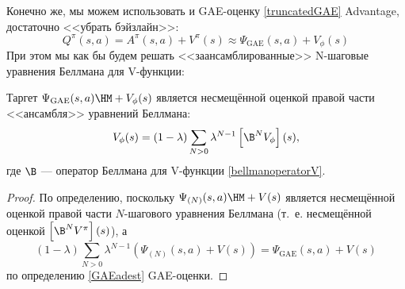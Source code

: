 Конечно же, мы можем использовать и GAE-оценку \eqref{truncatedGAE} Advantage, достаточно <<убрать бэйзлайн>>:
$$Q^\pi(s, a) = A^\pi(s, a) + V^\pi(s) \approx \Psi_{\mathrm{GAE}}(s, a) + V_{\phi}(s)$$
При этом мы как бы будем решать <<заансамблированные>> N-шаговые уравнения Беллмана для V-функции: 

\begin{proposition}
Таргет $\Psi_{\mathrm{GAE}}(s, a) \HM+ V_{\phi}(s)$ является несмещённой оценкой правой части <<ансамбля>> уравнений Беллмана:
$$V_{\phi}(s) = (1 - \lambda) \sum_{N > 0} \lambda^{N-1} \left[ \B^N V_\phi \right] (s),$$
где $\B$ --- оператор Беллмана для V-функции \eqref{bellmanoperatorV}.
\begin{proof}
По определению, поскольку $\Psi_{(N)}(s, a) \HM+ V(s)$ является несмещённой оценкой правой части $N$-шагового уравнения Беллмана (т.~е. несмещённой оценкой $\left[ \B^N V^\pi \right] (s)$), а
$$(1 - \lambda) \sum_{N > 0} \lambda^{N-1} (\Psi_{(N)}(s, a) + V(s)) = \Psi_{\mathrm{GAE}}(s, a) + V(s)$$
по определению \eqref{GAEadest} GAE-оценки.
\end{proof}
\end{proposition}



